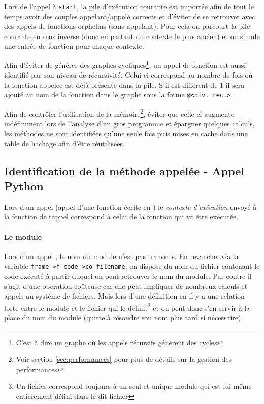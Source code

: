 \begin{note}
Lors de l'appel à \verb|start|, la pile d'exécution courante est importée afin de tout le temps avoir des couples appelant/appelé corrects et d'éviter de se retrouver avec des appels de fonctions orphelins (sans appelant). Pour cela on parcourt la pile courante en sens inverse (donc en partant du contexte le plus ancien) et on simule une entrée de fonction pour chaque contexte.
\end{note}

\begin{note}
Afin d'éviter de générer des graphes cycliques\footnote{C'est à dire un graphe où les appels récursifs génèrent des cycles}, un appel de fonction est aussi identifié par son niveau de récursivité. Celui-ci correspond au nombre de fois où la fonction appelée est déjà présente dans la pile. S'il est différent de 1 il sera ajouté au nom de la fonction dans le graphe sous la forme \verb|@<niv. rec.>|.
\end{note}

\begin{note}[Performances]
Afin de contrôler l'utilisation de la mémoire\footnote{Voir section \vref{sec:performances} pour plus de détails sur la gestion des performances}, éviter que celle-ci augmente indéfiniment lors de l'analyse d'un gros programme et épargner quelques calculs, les méthodes ne sont identifiées qu'une seule fois puis mises en cache dans une table de hachage afin d'être réutilisées.
\end{note}

\subsection{Identification de la méthode appelée - Appel Python}
\label{ident-python}
Lors d'un appel \Python (appel d'une fonction écrite en \Python) le \emph{\gls{contexte d'exécution}} envoyé à la fonction de rappel correspond à celui de la fonction qui va être exécutée.

\paragraph*{Le module} Lors d'un appel \Python, le nom du module n'est pas transmis. En revanche,  via la variable \verb|frame->f_code->co_filename|, on dispose du nom du fichier contenant le code exécuté à partir duquel on peut retrouver le nom du module. Par contre il s'agit d'une opération coûteuse car elle peut impliquer de nombreux calculs et appels au système de fichiers. Mais lors d'une définition en \Python il y a une relation forte entre le module et le fichier qui le définit\footnote{Un fichier correspond toujours à un seul et unique module qui est lui même entièrement défini dans le-dit fichier} et on peut donc s'en servir à la place du nom du module (quitte à résoudre son nom plus tard si nécessaire).

